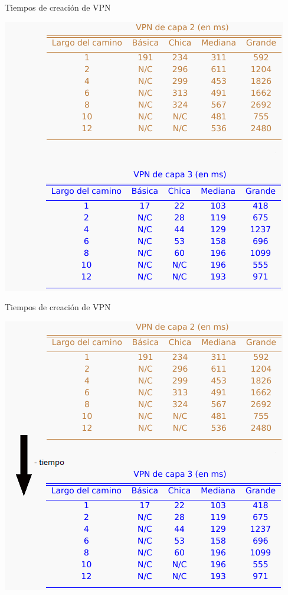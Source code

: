 \documentclass[xcolor=svgnames]{beamer}
\begin{document}
\begin{frame}{Tiempos de creación de VPN}
	\begin{center}
		\includegraphics[height=0.9\textheight]{tiempos_vpn}
	\end{center}
\end{frame}

\begin{frame}{Tiempos de creación de VPN}
	\begin{center}
		\includegraphics[height=0.9\textheight]{tiempos_vpn_tipo}
	\end{center}
\end{frame}
\end{document}
